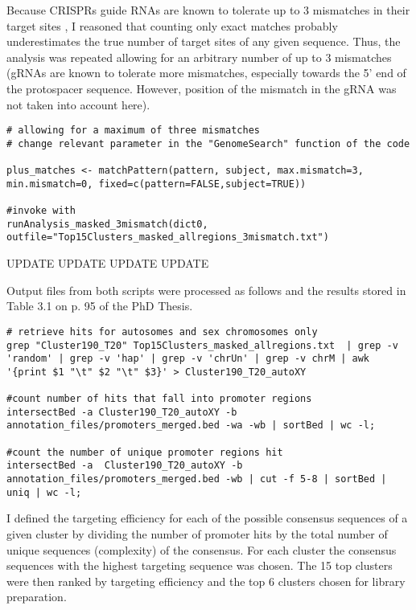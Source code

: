 Because CRISPRs guide RNAs are known to tolerate up to 3 mismatches in their target sites \cite{Mali:2013ft}, I reasoned that counting only exact matches probably underestimates the true number of target sites of any given sequence. Thus, the analysis was repeated allowing for an arbitrary number of up to 3 mismatches (gRNAs are known to tolerate more mismatches, especially towards the 5' end of the protospacer sequence. However, position of the mismatch in the gRNA was not taken into account here).

\begin{lstlisting}
# allowing for a maximum of three mismatches
# change relevant parameter in the "GenomeSearch" function of the code

plus_matches <- matchPattern(pattern, subject, max.mismatch=3, min.mismatch=0, fixed=c(pattern=FALSE,subject=TRUE))

#invoke with 
runAnalysis_masked_3mismatch(dict0, outfile="Top15Clusters_masked_allregions_3mismatch.txt")
\end{lstlisting}

UPDATE UPDATE UPDATE UPDATE

Output files from both scripts were processed as follows and the results stored in Table 3.1 on p. 95 of the PhD Thesis.

\begin{lstlisting}
# retrieve hits for autosomes and sex chromosomes only
grep "Cluster190_T20" Top15Clusters_masked_allregions.txt  | grep -v 'random' | grep -v 'hap' | grep -v 'chrUn' | grep -v chrM | awk '{print $1 "\t" $2 "\t" $3}' > Cluster190_T20_autoXY 

#count number of hits that fall into promoter regions
intersectBed -a Cluster190_T20_autoXY -b annotation_files/promoters_merged.bed -wa -wb | sortBed | wc -l;    

#count the number of unique promoter regions hit
intersectBed -a  Cluster190_T20_autoXY -b  annotation_files/promoters_merged.bed -wb | cut -f 5-8 | sortBed | uniq | wc -l;
\end{lstlisting}

I defined the targeting efficiency for each of the possible consensus sequences of a given cluster by dividing the number of promoter hits by the total number of unique sequences (complexity) of the consensus. For each cluster the consensus sequences with the highest targeting sequence was chosen. The 15 top clusters were then ranked by targeting efficiency and the top 6 clusters chosen for library preparation.
